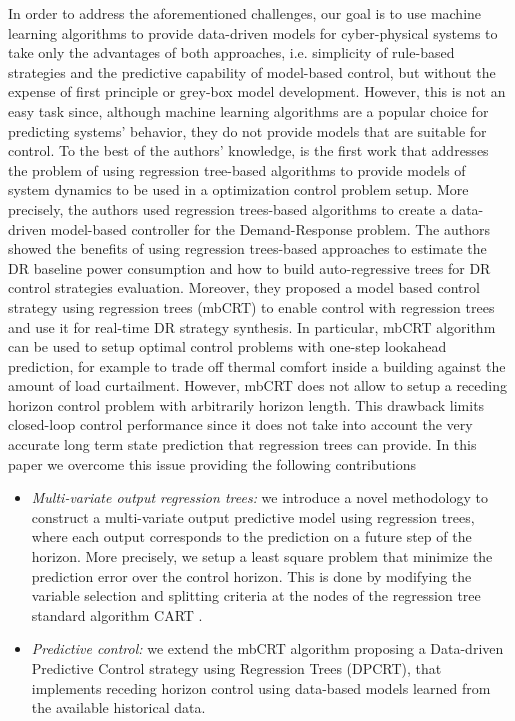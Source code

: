 \textcolor[rgb]{0.00,0.00,1.00}{In order to address the aforementioned challenges, our goal is to use machine learning algorithms to provide data-driven models for cyber-physical systems to take only the advantages of both approaches, i.e. simplicity of rule-based strategies and the predictive capability of model-based control, but without the expense of first principle or grey-box model development. However, this is not an easy task since, although machine learning algorithms are a popular choice for predicting systems' behavior, they do not provide models that are suitable for control. To the best of the authors' knowledge, \cite{Behl201630} is the first work that addresses the problem of using regression tree-based algorithms to provide models of system dynamics to be used in a optimization control problem setup. More precisely, the authors used regression trees-based algorithms to create a data-driven model-based controller for the Demand-Response problem. The authors showed the benefits of using regression trees-based approaches to estimate the DR baseline power consumption and how to build auto-regressive trees for DR control strategies evaluation. Moreover, they proposed a model based control strategy using regression trees (mbCRT) to enable control with regression trees and use it for real-time DR strategy synthesis. In particular, mbCRT algorithm can be used to setup optimal control problems with one-step lookahead prediction, for example to trade off thermal comfort inside a building against the amount of load curtailment. However, mbCRT does not allow to setup a receding horizon control problem with arbitrarily horizon length. This drawback limits closed-loop control performance since it does not take into account the very accurate long term state prediction that regression trees can provide. In this paper we overcome this issue providing the following contributions 
\\
\begin{itemize}[leftmargin=1cm]
	\item \emph{Multi-variate output regression trees:} we introduce a novel methodology to construct a multi-variate output predictive model using regression trees, where each output corresponds to the prediction on a future step of the horizon. More precisely, we setup a least square problem that minimize the prediction error over the control horizon. This is done by modifying the variable selection and splitting criteria at the nodes of the regression tree standard algorithm CART \cite{BreimanFriedmanStoneEtAl1984}.
	\item \emph{Predictive control:} we extend the mbCRT algorithm proposing a Data-driven Predictive Control strategy using Regression Trees (DPCRT), that implements receding horizon control using data-based models learned from the available historical data.

\end{itemize}}
